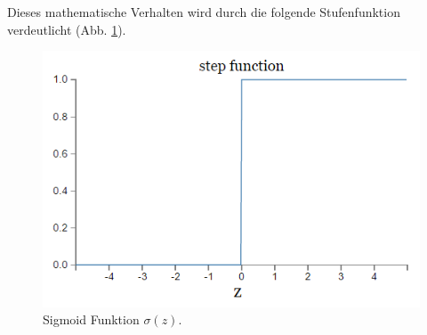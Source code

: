 \noindent
Dieses mathematische Verhalten wird durch die folgende Stufenfunktion verdeutlicht (Abb. \ref{fig:perceptron_plot}).
\begin{figure}[hbt]
	\centering
	\includegraphics[scale=0.6]{Bilder/perceptron_plot}
	\caption{Sigmoid Funktion $\sigma(z)$.} 
	\label{fig:perceptron_plot} 
\end{figure}

